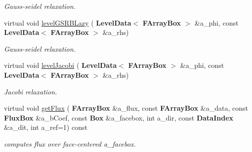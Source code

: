 \begin{DoxyCompactItemize}
\begin{DoxyCompactList}\small\item\em Gauss-\/seidel relaxation. \end{DoxyCompactList}\item 
\mbox{\label{class_a_m_r_non_linear_multi_comp_op_a301f4fedc4fed7a13e914d5f26f8d719}} 
virtual void \hyperlink{class_a_m_r_non_linear_multi_comp_op_a301f4fedc4fed7a13e914d5f26f8d719}{level\+G\+S\+R\+B\+Lazy} (\textbf{ Level\+Data}$<$ \textbf{ F\+Array\+Box} $>$ \&a\+\_\+phi, const \textbf{ Level\+Data}$<$ \textbf{ F\+Array\+Box} $>$ \&a\+\_\+rhs)
\begin{DoxyCompactList}\small\item\em Gauss-\/seidel relaxation. \end{DoxyCompactList}\item 
\mbox{\label{class_a_m_r_non_linear_multi_comp_op_a7fd508a366d0e779e8ac82ca7f03ec69}} 
virtual void \hyperlink{class_a_m_r_non_linear_multi_comp_op_a7fd508a366d0e779e8ac82ca7f03ec69}{level\+Jacobi} (\textbf{ Level\+Data}$<$ \textbf{ F\+Array\+Box} $>$ \&a\+\_\+phi, const \textbf{ Level\+Data}$<$ \textbf{ F\+Array\+Box} $>$ \&a\+\_\+rhs)
\begin{DoxyCompactList}\small\item\em Jacobi relaxation. \end{DoxyCompactList}\item 
\mbox{\label{class_a_m_r_non_linear_multi_comp_op_af01ccd4569cbeb9a4085c8c6a4d06e8c}} 
virtual void \hyperlink{class_a_m_r_non_linear_multi_comp_op_af01ccd4569cbeb9a4085c8c6a4d06e8c}{get\+Flux} (\textbf{ F\+Array\+Box} \&a\+\_\+flux, const \textbf{ F\+Array\+Box} \&a\+\_\+data, const \textbf{ Flux\+Box} \&a\+\_\+b\+Coef, const \textbf{ Box} \&a\+\_\+facebox, int a\+\_\+dir, const \textbf{ Data\+Index} \&a\+\_\+dit, int a\+\_\+ref=1) const
\begin{DoxyCompactList}\small\item\em computes flux over face-\/centered a\+\_\+facebox. \end{DoxyCompactList}\end{DoxyCompactItemize}
